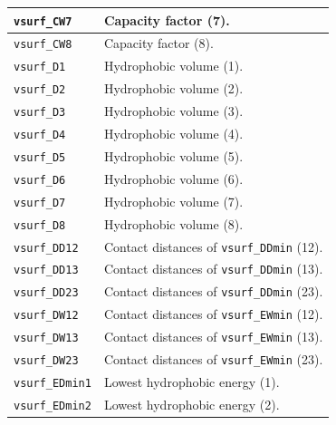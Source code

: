 \documentclass[12pt,a4paper]{article}
\begin{document}
\begin{longtable}{@{\zz}|p{}|p{}|}
\texttt{vsurf\_CW7} & Capacity factor (7).\\ \hline

\texttt{vsurf\_CW8} & Capacity factor (8).\\ \hline

\texttt{vsurf\_D1} & Hydrophobic volume (1).\\ \hline

\texttt{vsurf\_D2} & Hydrophobic volume (2).\\ \hline

\texttt{vsurf\_D3} & Hydrophobic volume (3).\\ \hline

\texttt{vsurf\_D4} & Hydrophobic volume (4).\\ \hline

\texttt{vsurf\_D5} & Hydrophobic volume (5).\\ \hline

\texttt{vsurf\_D6} & Hydrophobic volume (6).\\ \hline

\texttt{vsurf\_D7} & Hydrophobic volume (7).\\ \hline

\texttt{vsurf\_D8} & Hydrophobic volume (8).\\ \hline

\texttt{vsurf\_DD12} & Contact distances of \texttt{vsurf\_DDmin} (12).\\ \hline

\texttt{vsurf\_DD13} & Contact distances of \texttt{vsurf\_DDmin} (13).\\ \hline

\texttt{vsurf\_DD23} & Contact distances of \texttt{vsurf\_DDmin} (23).\\ \hline

\texttt{vsurf\_DW12} & Contact distances of \texttt{vsurf\_EWmin} (12).\\ \hline

\texttt{vsurf\_DW13} & Contact distances of \texttt{vsurf\_EWmin} (13).\\ \hline

\texttt{vsurf\_DW23} & Contact distances of \texttt{vsurf\_EWmin} (23).\\ \hline

\texttt{vsurf\_EDmin1} & Lowest hydrophobic energy (1).\\ \hline

\texttt{vsurf\_EDmin2} & Lowest hydrophobic energy (2).\\ \hline


\end{longtable}
\end{document}
